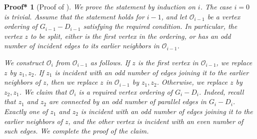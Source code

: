 \documentclass[10pt,a4paper]{amsart}
\newtheorem{proof*}{Proof*}
\begin{document}
\begin{proof*}[Proof of ]
We prove the statement by induction on $i$. The case $i=0$ is trivial. Assume that the statement holds for $i-1$, and let $\mathcal{O}_{i-1}$ be a vertex ordering of $G_{i-1}-D_{i-1}$ satisfying the required condition. In particular, the vertex $z$ to be split, either is the first vertex in the ordering, or has an odd number of incident edges to its earlier neighbors in $\mathcal{O}_{i-1}$.

We construct $\mathcal{O}_i$ from $\mathcal{O}_{i-1}$ as follows. If $z$ is the first vertex in $\mathcal{O}_{i-1}$, we replace $z$ by $z_1,z_2$. If $z_1$ is incident with an odd number of edges joining it to the earlier neighbors of $z$, then we replace $z$ in $\mathcal{O}_{i-1}$ by $z_1,z_2$. Otherwise, we replace $z$ by $z_2,z_1$.
We claim that $\mathcal{O}_i$ is a required vertex ordering of $G_i-D_i$. Indeed, recall that $z_1$ and $z_2$ are connected by an odd number of parallel edges in $G_i-D_i$. Exactly one of $z_1$ and $z_2$ is incident with an odd number of edges joining it to the earlier neighbors of $z$, and the other vertex is incident with an even number of such edges. We complete the proof of the claim.
\end{proof*}
\end{document}
